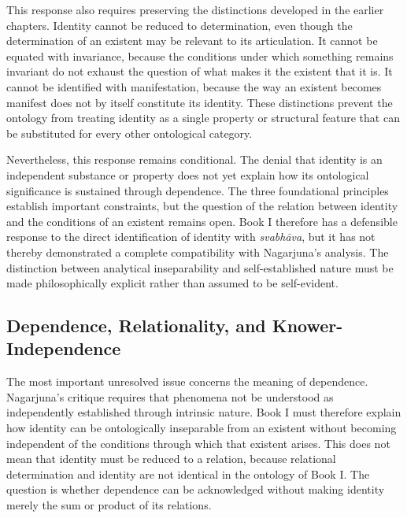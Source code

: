 \label{para:VS.B01.P01.C08.S18.SS15.P002}
This response also requires preserving the distinctions developed in the earlier chapters. Identity cannot be reduced to determination, even though the determination of an existent may be relevant to its articulation. It cannot be equated with invariance, because the conditions under which something remains invariant do not exhaust the question of what makes it the existent that it is. It cannot be identified with manifestation, because the way an existent becomes manifest does not by itself constitute its identity. These distinctions prevent the ontology from treating identity as a single property or structural feature that can be substituted for every other ontological category.

\label{para:VS.B01.P01.C08.S18.SS15.P003}
Nevertheless, this response remains conditional. The denial that identity is an independent substance or property does not yet explain how its ontological significance is sustained through dependence. The three foundational principles establish important constraints, but the question of the relation between identity and the conditions of an existent remains open. Book I therefore has a defensible response to the direct identification of identity with \emph{svabh\={a}va}, but it has not thereby demonstrated a complete compatibility with Nagarjuna's analysis. The distinction between analytical inseparability and self-established nature must be made philosophically explicit rather than assumed to be self-evident.

\subsection{Dependence, Relationality, and Knower-Independence}
\label{subsec:ch08_s18_ss16}

\label{para:VS.B01.P01.C08.S18.SS16.P001}
The most important unresolved issue concerns the meaning of dependence. Nagarjuna's critique requires that phenomena not be understood as independently established through intrinsic nature. Book I must therefore explain how identity can be ontologically inseparable from an existent without becoming independent of the conditions through which that existent arises. This does not mean that identity must be reduced to a relation, because relational determination and identity are not identical in the ontology of Book I. The question is whether dependence can be acknowledged without making identity merely the sum or product of its relations.

